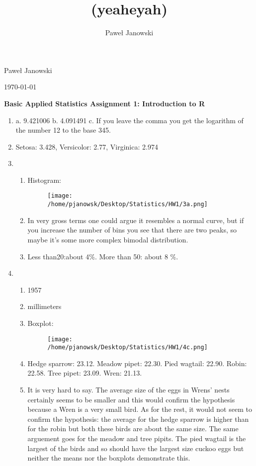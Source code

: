 \documentclass[11pt,letterpaper]{article}
\title{(yeaheyah)}
\author{Pawe\l{} Janowski}
\begin{document}
\begin{flushright}
\parskip 0pt
Pawe\l{} Janowski
 
\today
\vspace{10 mm}
\end{flushright}
\begin{center}
\begin{Large}
\textbf{Basic Applied Statistics
Assignment 1: Introduction to R}
\vspace{10 mm}
\end{Large}
\end{center}


\begin{enumerate}
\item a. 9.421006 b. 4.091491 c. If you leave the comma you get the logarithm of the number 12 to the base 345.
\item Setosa: 3.428, Versicolor: 2.77, Virginica: 2.974
\item 
  \begin{enumerate}
  \item Histogram:
	\begin{figure}[H]
	\centering
	\texttt{[image: /home/pjanowsk/Desktop/Statistics/HW1/3a.png]}
	\end{figure}
  \item In very gross terms one could argue it resembles a normal curve, but if you increase the number of bins you see that there are two peaks, so maybe it's some more complex bimodal distribution.
  \item Less than20:about 4\%. More than 50: about 8 \%.
  \end{enumerate}
\item
  \begin{enumerate}
  \item 1957
  \item millimeters
  \item Boxplot:
  	\begin{figure}[H]
  	\centering
  	\texttt{[image: /home/pjanowsk/Desktop/Statistics/HW1/4c.png]}
  	\end{figure}
  \item Hedge sparrow: 23.12. Meadow pipet: 22.30. Pied wagtail: 22.90. Robin: 22.58. Tree pipet: 23.09. Wren: 21.13.
  \item It is very hard to say. The average size of the eggs in Wrens' nests certainly seems to be smaller and this would confirm the hypothesis because a Wren is a very small bird. As for the rest, it would not seem to confirm the hypothesis: the average for the hedge sparrow is higher than for the robin but both these birds are about the same size. The same arguement goes for the meadow and tree pipits. The pied wagtail is the largest of the birds and so should have the largest size cuckoo eggs but neither the means nor the boxplots demonstrate this.

\end{enumerate}
\end{enumerate}
\end{document}
